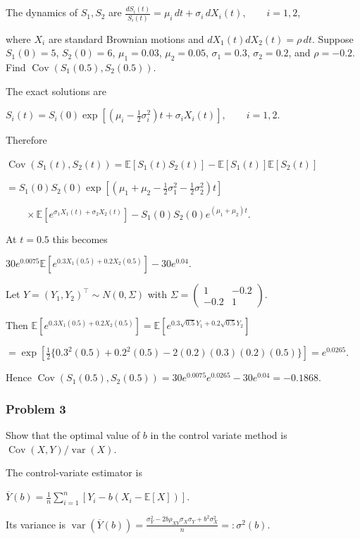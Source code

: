  The dynamics of $S_1,S_2$ are
$\frac{dS_i(t)}{S_i(t)}=\mu_i\,dt+\sigma_i\,dX_i(t),\qquad i=1,2$,

where $X_i$ are standard Brownian motions and $dX_1(t)dX_2(t)=\rho\,dt$. Suppose $S_1(0)=5$, $S_2(0)=6$, $\mu_1=0.03$, $\mu_2=0.05$, $\sigma_1=0.3$, $\sigma_2=0.2$, and $\rho=-0.2$. Find $\operatorname{Cov}(S_1(0.5),S_2(0.5))$.

 The exact solutions are

$S_i(t)=S_i(0)\exp\left[\left(\mu_i-\frac12\sigma_i^2\right)t+\sigma_iX_i(t)\right],\qquad i=1,2$.

Therefore

$\operatorname{Cov}(S_1(t),S_2(t))=\mathbb{E}[S_1(t)S_2(t)]-\mathbb{E}[S_1(t)]\mathbb{E}[S_2(t)]$

$=S_1(0)S_2(0)\exp\left[\left(\mu_1+\mu_2-\frac12\sigma_1^2-\frac12\sigma_2^2\right)t\right]$

$\qquad\times\mathbb{E}\left[e^{\sigma_1X_1(t)+\sigma_2X_2(t)}\right]-S_1(0)S_2(0)e^{(\mu_1+\mu_2)t}$.

At $t=0.5$ this becomes

$30e^{0.0075}\mathbb{E}[e^{0.3X_1(0.5)+0.2X_2(0.5)}]-30e^{0.04}$.

Let $Y=(Y_1,Y_2)^\top\sim N(0,\Sigma)$ with
$\Sigma=\begin{pmatrix}1&-0.2\\-0.2&1\end{pmatrix}$.

Then
$\mathbb{E}[e^{0.3X_1(0.5)+0.2X_2(0.5)}]=\mathbb{E}[e^{0.3\sqrt{0.5}Y_1+0.2\sqrt{0.5}Y_2}]$

$=\exp\left[\frac12\{0.3^2(0.5)+0.2^2(0.5)-2(0.2)(0.3)(0.2)(0.5)\}\right]=e^{0.0265}$.

Hence
$\operatorname{Cov}(S_1(0.5),S_2(0.5))=30e^{0.0075}e^{0.0265}-30e^{0.04}=-0.1868$.

\subsubsection*{Problem 3}

 Show that the optimal value of $b$ in the control variate method is $\operatorname{Cov}(X,Y)/\operatorname{var}(X)$.

 The control-variate estimator is

$\overline{Y}(b)=\frac1n\sum_{i=1}^n[Y_i-b(X_i-\mathbb{E}[X])]$.

Its variance is
$\operatorname{var}(\overline{Y}(b))=\frac{\sigma_Y^2-2b\rho_{XY}\sigma_X\sigma_Y+b^2\sigma_X^2}{n}=:\sigma^2(b)$.

